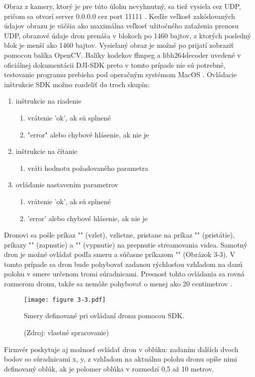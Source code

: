 {Obraz z kamery, ktorý je pre túto úlohu nevyhnutný, sa tiež vysiela cez UDP, pričom sa otvorí server 0.0.0.0 cez port 11111 \citep{Virbora2022}. Keďže veľkosť zakódovaných údajov obrazu je väčšia ako maximálna veľkosť užitočného zaťaženia prenosu UDP, obrazové údaje dron prenáša v blokoch po 1460 bajtov, z ktorých posledný blok je menší ako 1460 bajtov. Vysielaný obraz je možné po prijatí zobraziť pomocou balíka OpenCV. Balíky kodekov ffmpeg a libh264decoder uvedené v oficiálnej dokumentácii DJI-SDK preto v tomto prípade nie sú potrebné, testovanie programu prebieha pod operačným systémom MacOS \citep{Virbora2022}. 
Ovládacie inštrukcie SDK možno rozdeliť do troch skupín: 
\begin{enumerate}
\item inštrukcie na riadenie 
\begin{enumerate}
    \item vrátenie 'ok', ak sú splnené 
    \item "error" alebo chybové hlásenie, ak nie je 
\end{enumerate}
\item inštrukcie na čítanie 
\begin{enumerate}
    \item vráti hodnotu požadovaného parametra
\end{enumerate}
\item ovládanie nastavením parametrov 
\begin{enumerate}
    \item vrátenie 'ok', ak sú splnené 
    \item 'error' alebo chybové hlásenie, ak nie je 
\end{enumerate}
\end{enumerate}



Dronovi sa pošle príkaz "" (vzlet), vzlietne, pristane na príkaz "" (pristátie), príkazy "" (zapnutie) a "" (vypnutie) na prepnutie streamovania videa. Samotný dron je možné ovládať podľa smeru a súčasne príkazom "" (Obrázok 3-3). V tomto prípade sa dron bude pohybovať zadanou rýchlosťou vzhľadom na danú polohu v smere určenom tromi súradnicami. Presnosť tohto ovládania sa rovná rozmerom dronu, takže sa nemôže pohybovať o menej ako 20 centimetrov \citep{TelloSDK}. 

\begin{figure}[ht!]
    \centering
    \texttt{[image: figure 3-3.pdf]}
    \caption{Smery definované pri ovládaní dronu pomocou SDK.}
    \captionsetup{font=footnotesize, justification=centering, skip=5pt}
    \caption*{(Zdroj: vlastné spracovanie)}
    \label{o:3-3}
\end{figure}  
Firmvér poskytuje aj možnosť ovládať dron v oblúku: zadaním ďalších dvoch bodov so súradnicami x, y, z vzhľadom na aktuálnu polohu dronu opíše nimi definovaný oblúk, ak je polomer oblúka v rozmedzí 0,5 až 10 metrov.

}
